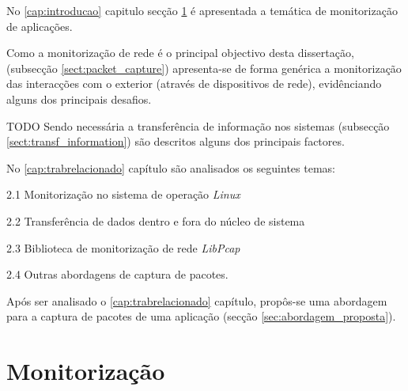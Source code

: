 No \ref{cap:introducao} capitulo secção \ref{sect:descricao} é apresentada a temática de monitorização de aplicações.

Como a monitorização de rede é o principal objectivo desta dissertação, (subsecção \ref{sect:packet_capture}) apresenta-se de forma genérica a monitorização das interacções com o exterior (através de dispositivos de rede), evidênciando alguns dos principais desafios.

TODO
Sendo necessária a transferência de informação nos sistemas (subsecção \ref{sect:transf_information}) são descritos alguns dos principais factores.

No \ref{cap:trabrelacionado} capítulo são analisados os seguintes temas:
\begin{description}

\item 2.1 Monitorização no sistema de operação \textit{Linux}

\item 2.2 Transferência de dados dentro e fora do núcleo de sistema

\item 2.3 Biblioteca de monitorização de rede \textit{LibPcap}

\item 2.4 Outras abordagens de captura de pacotes.

\end{description}

Após ser analisado o \ref{cap:trabrelacionado} capítulo, propôs-se uma abordagem para a captura de pacotes de uma aplicação (secção \ref{sec:abordagem_proposta}).


\section{Monitorização} \label{sect:descricao}


